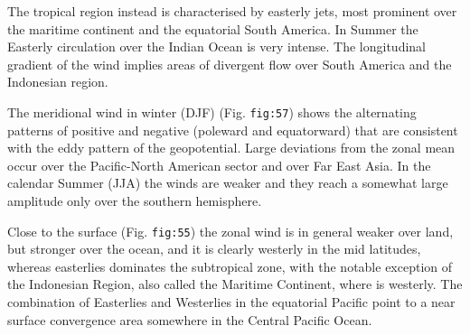 The tropical region instead is characterised by easterly jets, most
prominent over the maritime continent and the equatorial South America.
In Summer the Easterly circulation over the Indian Ocean is very
intense. The longitudinal gradient of the wind implies areas of
divergent flow over South America and the Indonesian region.

The meridional wind in winter (DJF) (Fig. \texttt{fig:57}) shows the
alternating patterns of positive and negative (poleward and equatorward)
that are consistent with the eddy pattern of the geopotential. Large
deviations from the zonal mean occur over the Pacific-North American
sector and over Far East Asia. In the calendar Summer (JJA) the winds
are weaker and they reach a somewhat large amplitude only over the
southern hemisphere.

Close to the surface (Fig. \texttt{fig:55}) the zonal wind is in general
weaker over land, but stronger over the ocean, and it is clearly
westerly in the mid latitudes, whereas easterlies dominates the
subtropical zone, with the notable exception of the Indonesian Region,
also called the Maritime Continent, where is westerly. The combination
of Easterlies and Westerlies in the equatorial Pacific point to a near
surface convergence area somewhere in the Central Pacific Ocean.

